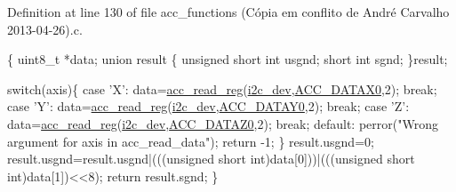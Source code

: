 Definition at line 130 of file acc\-\_\-functions (\-Cópia em conflito de André Carvalho 2013-\/04-\/26).\-c.


\begin{DoxyCode}
\{
  uint8\_t *data;
  \textcolor{keyword}{union }result
  \{
    \textcolor{keywordtype}{unsigned} \textcolor{keywordtype}{short} \textcolor{keywordtype}{int} usgnd;
    \textcolor{keywordtype}{short} \textcolor{keywordtype}{int} sgnd;
  \}result;

  \textcolor{keywordflow}{switch}(axis)\{
    \textcolor{keywordflow}{case} \textcolor{charliteral}{'X'}:
      data=\hyperlink{group__acc_ga2a91c44eebbe44f4d3b8c508633512f9}{acc\_read\_reg}(\hyperlink{CommunicationV0_2communication_8c_a7751bd45ac1064efb35adf1f19c25db8}{i2c\_dev},\hyperlink{communication_2imu__regs_8h_afae448fbad872220013e5c3abf0f3d9f}{ACC\_DATAX0},2);
      \textcolor{keywordflow}{break};
    \textcolor{keywordflow}{case} \textcolor{charliteral}{'Y'}:
      data=\hyperlink{group__acc_ga2a91c44eebbe44f4d3b8c508633512f9}{acc\_read\_reg}(\hyperlink{CommunicationV0_2communication_8c_a7751bd45ac1064efb35adf1f19c25db8}{i2c\_dev},\hyperlink{communication_2imu__regs_8h_a6aa168a0f3e35bfee4da87c32dcb4b46}{ACC\_DATAY0},2);
      \textcolor{keywordflow}{break};
    \textcolor{keywordflow}{case} \textcolor{charliteral}{'Z'}:
      data=\hyperlink{group__acc_ga2a91c44eebbe44f4d3b8c508633512f9}{acc\_read\_reg}(\hyperlink{CommunicationV0_2communication_8c_a7751bd45ac1064efb35adf1f19c25db8}{i2c\_dev},\hyperlink{communication_2imu__regs_8h_ab87ce2339aeb4adb7fb71daa80f3bc68}{ACC\_DATAZ0},2);
      \textcolor{keywordflow}{break};
    \textcolor{keywordflow}{default}:
      perror(\textcolor{stringliteral}{"Wrong argument for axis in acc\_read\_data"});
      \textcolor{keywordflow}{return} -1;
  \}
  result.usgnd=0;
  result.usgnd=result.usgnd|(((\textcolor{keywordtype}{unsigned} \textcolor{keywordtype}{short} int)data[0]))|(((\textcolor{keywordtype}{unsigned} \textcolor{keywordtype}{short} \textcolor{keywordtype}{
      int})data[1])<<8);
  \textcolor{keywordflow}{return} result.sgnd;
\}
\end{DoxyCode}
